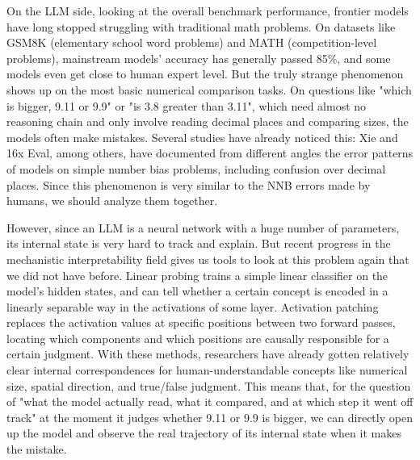 On the LLM side, looking at the overall benchmark performance, frontier models have long stopped struggling with traditional math problems. On datasets like GSM8K (elementary school word problems) and MATH (competition-level problems), mainstream models' accuracy has generally passed 85\%\cite{cobbe2021, wallace2019}, and some models even get close to human expert level. But the truly strange phenomenon shows up on the most basic numerical comparison tasks. On questions like "which is bigger, 9.11 or 9.9" or "is 3.8 greater than 3.11", which need almost no reasoning chain and only involve reading decimal places and comparing sizes, the models often make mistakes. Several studies have already noticed this: Xie\cite{xie2602} and 16x Eval\cite{eval16x2025}, among others, have documented from different angles the error patterns of models on simple number bias problems, including confusion over decimal places. Since this phenomenon is very similar to the NNB errors made by humans, we should analyze them together.

However, since an LLM is a neural network with a huge number of parameters, its internal state is very hard to track and explain. But recent progress in the mechanistic interpretability field gives us tools to look at this problem again that we did not have before. Linear probing trains a simple linear classifier on the model's hidden states, and can tell whether a certain concept is encoded in a linearly separable way in the activations of some layer. Activation patching replaces the activation values at specific positions between two forward passes, locating which components and which positions are causally responsible for a certain judgment. With these methods, researchers have already gotten relatively clear internal correspondences for human-understandable concepts like numerical size, spatial direction, and true/false judgment\cite{meng2022, huang2025}. This means that, for the question of "what the model actually read, what it compared, and at which step it went off track" at the moment it judges whether 9.11 or 9.9 is bigger, we can directly open up the model and observe the real trajectory of its internal state when it makes the mistake.
